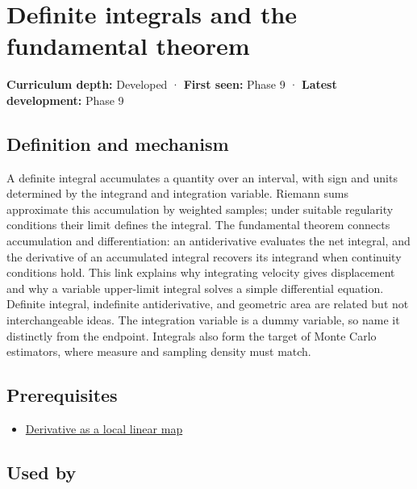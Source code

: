 \hypertarget{appendix-1a50e72435c2}{}\label{referencestart:appendix-1a50e72435c2}
\section{Definite integrals and the fundamental theorem}\label{appendix-1a50e72435c2-definite-integrals-and-the-fundamental-theorem}

\textbf{Curriculum depth:} Developed · \textbf{First seen:} Phase 9 · \textbf{Latest development:} Phase 9

\begin{allmightroledefinition}

\subsection{Definition and mechanism}\label{appendix-1a50e72435c2-definition-and-mechanism}

A definite integral accumulates a quantity over an interval, with sign and units determined by the integrand and integration variable. Riemann sums approximate this accumulation by weighted samples; under suitable regularity conditions their limit defines the integral. The fundamental theorem connects accumulation and differentiation: an antiderivative evaluates the net integral, and the derivative of an accumulated integral recovers its integrand when continuity conditions hold. This link explains why integrating velocity gives displacement and why a variable upper-limit integral solves a simple differential equation. Definite integral, indefinite antiderivative, and geometric area are related but not interchangeable ideas. The integration variable is a dummy variable, so name it distinctly from the endpoint. Integrals also form the target of Monte Carlo estimators, where measure and sampling density must match.

\end{allmightroledefinition}

\subsection{Prerequisites}\label{appendix-1a50e72435c2-prerequisites}

\begin{itemize}
\tightlist
\item
  \hyperref[appendix-7bc181935c42]{Derivative as a local linear map}
\end{itemize}

\subsection{Used by}\label{appendix-1a50e72435c2-used-by}

